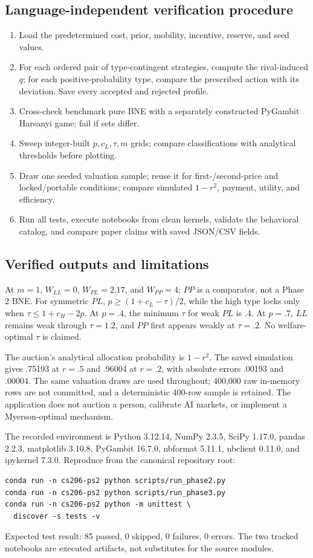 \subsection{Language-independent verification procedure}
\begin{enumerate}
\item Load the predetermined cost, prior, mobility, incentive, reserve, and seed values.
\item For each ordered pair of type-contingent strategies, compute the rival-induced $q$; for each positive-probability type, compare the prescribed action with its deviation. Save every accepted and rejected profile.
\item Cross-check benchmark pure BNE with a separately constructed PyGambit Harsanyi game; fail if sets differ.
\item Sweep integer-built $p,c_L,\tau,m$ grids; compare classifications with analytical thresholds before plotting.
\item Draw one seeded valuation sample; reuse it for first-/second-price and locked/portable conditions; compare simulated $1-r^2$, payment, utility, and efficiency.
\item Run all tests, execute notebooks from clean kernels, validate the behavioral catalog, and compare paper claims with saved JSON/CSV fields.
\end{enumerate}

\subsection{Verified outputs and limitations}
At $m=1$, $W_{LL}=0$, $W_{PL}=2.17$, and $W_{PP}=4$; $PP$ is a comparator, not a Phase 2 BNE. For symmetric $PL$, $p\ge(1+c_L-\tau)/2$, while the high type locks only when $\tau\le1+c_H-2p$. At $p=.4$, the minimum $\tau$ for weak $PL$ is .4. At $p=.7$, $LL$ remains weak through $\tau=1.2$, and $PP$ first appears weakly at $\tau=.2$. No welfare-optimal $\tau$ is claimed.

The auction's analytical allocation probability is $1-r^2$. The saved simulation gives .75193 at $r=.5$ and .96004 at $r=.2$, with absolute errors .00193 and .00004. The same valuation draws are used throughout; 400,000 raw in-memory rows are not committed, and a deterministic 400-row sample is retained. The application does not auction a person, calibrate AI markets, or implement a Myerson-optimal mechanism.

The recorded environment is Python 3.12.14, NumPy 2.3.5, SciPy 1.17.0, pandas 2.2.3, matplotlib 3.10.8, PyGambit 16.7.0, nbformat 5.11.1, nbclient 0.11.0, and ipykernel 7.3.0. Reproduce from the canonical repository root:
\begin{verbatim}
conda run -n cs206-ps2 python scripts/run_phase2.py
conda run -n cs206-ps2 python scripts/run_phase3.py
conda run -n cs206-ps2 python -m unittest \
  discover -s tests -v
\end{verbatim}
Expected test result: 85 passed, 0 skipped, 0 failures, 0 errors. The two tracked notebooks are executed artifacts, not substitutes for the source modules.

